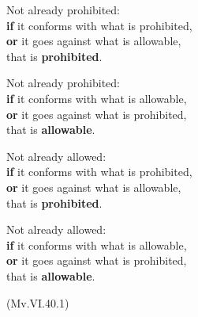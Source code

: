 \begin{multicols}{2}

Not already prohibited:\\
\textbf{if} it conforms with what is prohibited,\\
\textbf{or} it goes against what is allowable,\\
that is \textbf{prohibited}.

Not already prohibited:\\
\textbf{if} it conforms with what is allowable,\\
\textbf{or} it goes against what is prohibited,\\
that is \textbf{allowable}.

\columnbreak

Not already allowed:\\
\textbf{if} it conforms with what is prohibited,\\
\textbf{or} it goes against what is allowable,\\
that is \textbf{prohibited}.

Not already allowed:\\
\textbf{if} it conforms with what is allowable,\\
\textbf{or} it goes against what is prohibited,\\
that is \textbf{allowable}.

\end{multicols}

(Mv.VI.40.1)

